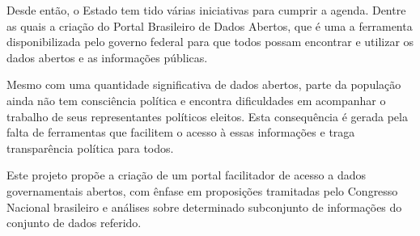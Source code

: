 \documentclass[
	12pt,				%
	openright,			%
	twoside,			%
	a4paper,			%
	english,			%
	french,				%
	spanish,			%
	brazil				%
	]{abntex2}
\begin{document}
Desde então, o Estado tem tido várias iniciativas para cumprir a agenda. Dentre as quais a criação do 
Portal Brasileiro de Dados Abertos, que é uma a ferramenta disponibilizada pelo governo federal para que todos possam encontrar e 
utilizar os dados abertos e as informações públicas. 

Mesmo com uma quantidade significativa de dados abertos, parte da população ainda não tem consciência política e 
encontra dificuldades em acompanhar o trabalho de seus representantes políticos eleitos. Esta consequência é gerada 
pela falta de ferramentas que facilitem o acesso à essas informações e traga transparência política para todos. 

Este projeto propõe a criação de um portal facilitador de acesso a dados governamentais abertos, com ênfase em proposições tramitadas pelo 
Congresso Nacional brasileiro e análises sobre determinado subconjunto de informações do conjunto de dados referido.


%


\end{document}
